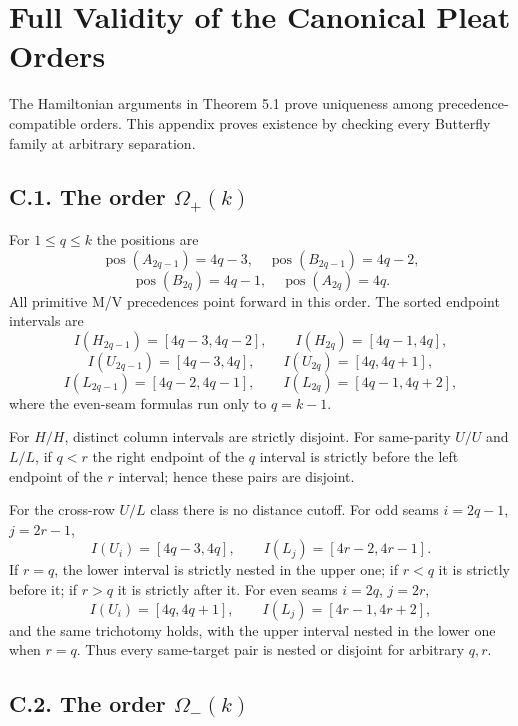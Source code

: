 \documentclass[11pt]{article}
\theoremstyle{definition}
\theoremstyle{remark}
\begin{document}
\appendix
\section{Full Validity of the Canonical Pleat Orders}\label{appendix-c.-full-validity-of-the-canonical-pleat-orders}

The Hamiltonian arguments in Theorem 5.1 prove uniqueness among
precedence-compatible orders. This appendix proves existence by checking
every Butterfly family at arbitrary separation.

\subsection{\texorpdfstring{C.1. The order
\(\Omega_+(k)\)}{C.1. The order \textbackslash Omega\_+(k)}}\label{c.1.-the-order-omega_k}

For \(1\le q\le k\) the positions are \[
\operatorname{pos}(A_{2q-1})=4q-3,\quad
\operatorname{pos}(B_{2q-1})=4q-2,
\] \[
\operatorname{pos}(B_{2q})=4q-1,\quad
\operatorname{pos}(A_{2q})=4q.
\] All primitive M/V precedences point forward in this order. The sorted
endpoint intervals are \[
I(H_{2q-1})=[4q-3,4q-2],\qquad I(H_{2q})=[4q-1,4q],
\] \[
I(U_{2q-1})=[4q-3,4q],\qquad I(U_{2q})=[4q,4q+1],
\] \[
I(L_{2q-1})=[4q-2,4q-1],\qquad I(L_{2q})=[4q-1,4q+2],
\] where the even-seam formulas run only to \(q=k-1\).

For \(H/H\), distinct column intervals are strictly disjoint. For
same-parity \(U/U\) and \(L/L\), if \(q<r\) the right endpoint of the
\(q\) interval is strictly before the left endpoint of the \(r\)
interval; hence these pairs are disjoint.

For the cross-row \(U/L\) class there is no distance cutoff. For odd
seams \(i=2q-1\), \(j=2r-1\), \[
I(U_i)=[4q-3,4q],\qquad I(L_j)=[4r-2,4r-1].
\] If \(r=q\), the lower interval is strictly nested in the upper one;
if \(r<q\) it is strictly before it; if \(r>q\) it is strictly after it.
For even seams \(i=2q\), \(j=2r\), \[
I(U_i)=[4q,4q+1],\qquad I(L_j)=[4r-1,4r+2],
\] and the same trichotomy holds, with the upper interval nested in the
lower one when \(r=q\). Thus every same-target pair is nested or
disjoint for arbitrary \(q,r\).

\subsection{\texorpdfstring{C.2. The order
\(\Omega_-(k)\)}{C.2. The order \textbackslash Omega\_-(k)}}\label{c.2.-the-order-omega_-k}
\end{document}
